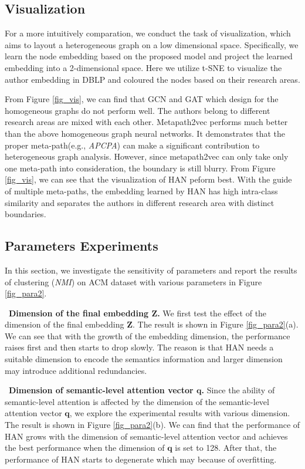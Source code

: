 \subsection{Visualization}


For a more intuitively comparation, we conduct the task of visualization,  which aims to layout a heterogeneous graph on a low dimensional space. Specifically, we learn the node embedding based on the proposed model and project the learned embedding into a 2-dimensional space.
Here we utilize t-SNE \cite{maaten2008visualizing} to visualize the author embedding in DBLP and coloured the nodes based on their research areas. 



From Figure \ref{fig_vis}, we can find that GCN and GAT which design for the homogeneous graphs do not perform well. The authors belong to different research areas are mixed with each other.
Metapath2vec performs much better than the above homogeneous graph neural networks.
It demonstrates that the proper meta-path(e.g., \emph{APCPA}) can make a significant contribution to heterogeneous graph analysis.
However, since metapath2vec can only take only one meta-path into consideration, the boundary is still blurry.
From Figure \ref{fig_vis}, we can see that the visualization of  HAN peform best. 
With the guide of multiple meta-paths,  the embedding learned by HAN has high intra-class similarity and separates the authors in different research area with distinct boundaries. 

\subsection{Parameters Experiments}
In this section, we investigate the sensitivity of parameters and report the results of clustering (\emph{NMI}) on ACM dataset with various parameters in Figure \ref{fig_para2}.

\textbullet\  \textbf{Dimension of the final embedding $\mathbf{Z}$.} We first test the effect of the dimension of the final embedding $\mathbf{Z}$. 
	The result is shown in Figure \ref{fig_para2}(a).
	We can see that with the growth of the embedding dimension, 
	the performance raises first and then starts to drop slowly. 
	The reason is that HAN needs a suitable dimension to encode the semantics information and 
	larger dimension may introduce additional redundancies. 

\textbullet\   \textbf{Dimension of semantic-level attention vector $\mathbf{q}$.} Since the ability of semantic-level attention is affected by the dimension of the semantic-level attention vector $\mathbf{q}$, we explore the experimental results 
	with various dimension. The result is shown in Figure \ref{fig_para2}(b).
	We can find that the performance of HAN grows with the dimension of semantic-level attention vector and achieves the best performance when the dimension of $\mathbf{q}$ is set to 128.
	After that, the performance of HAN starts to degenerate which may because of overfitting.
	


